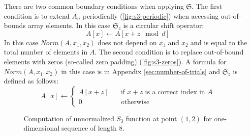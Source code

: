 \documentclass[reprint,amsmath,amssymb,aps,pre,showkeys,showpacs]{revtex4-1}
\begin{document}
There are two common boundary conditions when applying $\mathfrak{S}$. The
first condition is to extend $A_n$ periodically (\cref{fig:s3-periodic}) when
accessing out-of-bounds array elements. In this case $\mathfrak{S}_z$ is a
circular shift operator:
\begin{equation}
  A[x] \leftarrow A[x+z \mod d]
\end{equation}
In this case $Norm(A, x_1, x_2)$ does not depend on $x_1$ and $x_2$ and
is equal to the total number of elements in $A$. The second condition is to
replace out-of-bound elements with zeros (so-called zero padding)
(\cref{fig:s3-zeros}). A formula for $Norm(A, x_1, x_2)$ in this case is in Appendix
\ref{sec:number-of-trials} and $\mathfrak{S}_z$ is defined as follows:
\begin{equation}
  A[x] \leftarrow \left\{
  \begin{array}{ll}
    A[x+z] & \quad \text{if $x+z$ is a correct index in $A$} \\
    0 & \quad \text{otherwise}
  \end{array}
  \right.
\end{equation}
\begin{figure}[tp]
  \centering
  \hfill
  \caption[]{Computation of unnormalized $S_3$ function at point $(1, 2)$ for
    one-dimensional sequence of length 8.}
  \label{fig:s3-computation}
\end{figure}
\end{document}
